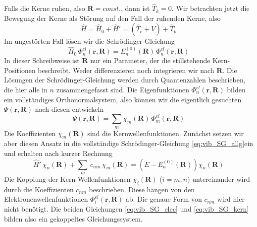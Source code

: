 Falls die Kerne ruhen, also $\mathbf{R} = const.$, dann ist $\hat{T}_k = 0$. Wir betrachten jetzt die Bewegung der Kerne als Störung auf den Fall der ruhenden Kerne, also
\begin{equation}
 \hat{H} = \hat{H}_0 + \hat{H}' = \left( \hat{T}_e + V \right) +  \hat{T}_k
\end{equation}
Im ungestörten Fall lösen wir die Schrödinger-Gleichung
\begin{equation}
\hat{H}_0 \, \Phi_n^{el}  (\mathbf{r}, \mathbf{R})  = E_n^{(0)}  (\mathbf{R})  \, \Phi_n^{el}  (\mathbf{r}, \mathbf{R})    \label{eq:vib_SG_elec}
\end{equation}
In dieser Schreibweise ist $\mathbf{R}$ nur ein Parameter, der die stillstehende Kern-Positionen beschreibt. Weder differenzieren noch integrieren wir nach  $\mathbf{R}$. Die Lösungen der Schrödinger-Gleichung werden durch Quantenzahlen beschrieben, die hier alle in $n$ zusammengefasst sind. Die Eigenfunktionen $\Phi_n^{el}  (\mathbf{r}, \mathbf{R}) $ bilden ein vollständiges Orthonormalsystem, also können wir die eigentlich gesuchten $\Psi (\mathbf{r}, \mathbf{R})$ nach diesen entwickeln
\begin{equation}
\Psi (\mathbf{r}, \mathbf{R}) = \sum_m \chi_m (\mathbf{R}) \,\Phi_m^{el}  (\mathbf{r}, \mathbf{R}) 
\end{equation}
Die Koeffizienten $\chi_m (\mathbf{R}) $ sind die Kernwellenfunktionen. Zunächst setzen wir aber diesen Ansatz in die vollständige Schrödinger-Gleichung   \ref{eq:vib_SG_allg}ein und erhalten nach kurzer Rechnung
\begin{equation}
\hat{H}' \, \chi_n (\mathbf{R}) + \sum_m \, c_{n m} \, \chi_m (\mathbf{R}) = \left( E - E_n^{(0)}(\mathbf{R})  \right) \chi_n (\mathbf{R})   \label{eq:vib_SG_kern}
\end{equation}
Die Kopplung der Kern-Wellenfunktionen $\chi_i (\mathbf{R}) $ ($i = m,n$) untereinander wird durch die Koeffizienten $c_{nm}$ beschrieben. Diese hängen von den Elektronenwellenfunktionen $\Phi_i^{el}  (\mathbf{r}, \mathbf{R}) $   ab. Die genaue Form von $c_{nm}$  wird hier nicht benötigt. Die beiden Gleichungen   \ref{eq:vib_SG_elec} und   \ref{eq:vib_SG_kern} bilden also ein gekoppeltes Gleichungssystem.

